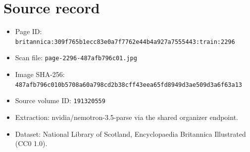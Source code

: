 \documentclass{article}
\begin{document}
\section*{Source record}
\begin{itemize}
\item Page ID: \texttt{britannica:309f765b1ecc83e0a7f7762e44b4a927a7555443:train:2296}
\item Scan file: \texttt{page-2296-487afb796c01.jpg}
\item Image SHA-256: \texttt{487afb796c010b5708a60a798cd2b38cff43eea65fd8949d3ae509d3a6f63a13}
\item Source volume ID: \texttt{191320559}
\item Extraction: nvidia/nemotron-3.5-parse via the shared organizer endpoint.
\item Dataset: National Library of Scotland, Encyclopaedia Britannica Illustrated (CC0 1.0).
\end{itemize}
\end{document}
